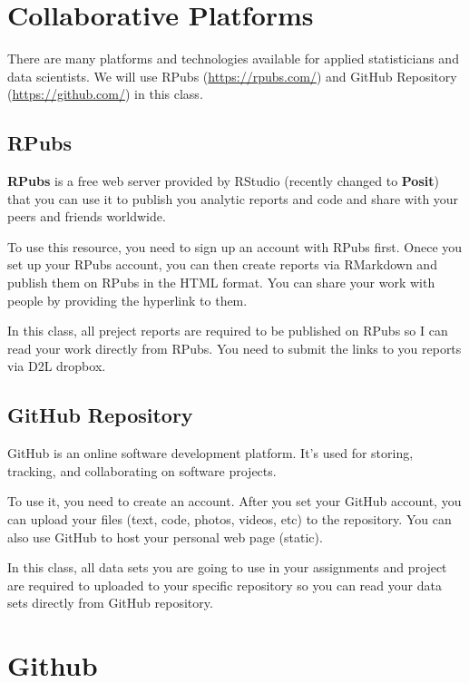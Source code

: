 \documentclass[
]{book}
\begin{document}
\hypertarget{collaborative-platforms}{%
\section{Collaborative Platforms}\label{collaborative-platforms}}

There are many platforms and technologies available for applied statisticians and data scientists. We will use RPubs (\url{https://rpubs.com/}) and GitHub Repository (\url{https://github.com/}) in this class.

\hypertarget{rpubs}{%
\subsection{RPubs}\label{rpubs}}

\textbf{RPubs} is a free web server provided by RStudio (recently changed to \textbf{Posit}) that you can use it to publish you analytic reports and code and share with your peers and friends worldwide.

To use this resource, you need to sign up an account with RPubs first. Onece you set up your RPubs account, you can then create reports via RMarkdown and publish them on RPubs in the HTML format. You can share your work with people by providing the hyperlink to them.

In this class, all preject reports are required to be published on RPubs so I can read your work directly from RPubs. You need to submit the links to you reports via D2L dropbox.

\hypertarget{github-repository}{%
\subsection{GitHub Repository}\label{github-repository}}

GitHub is an online software development platform. It's used for storing, tracking, and collaborating on software projects.

To use it, you need to create an account. After you set your GitHub account, you can upload your files (text, code, photos, videos, etc) to the repository. You can also use GitHub to host your personal web page (static).

In this class, all data sets you are going to use in your assignments and project are required to uploaded to your specific repository so you can read your data sets directly from GitHub repository.

\hypertarget{github}{%
\section{Github}\label{github}}
\end{document}

